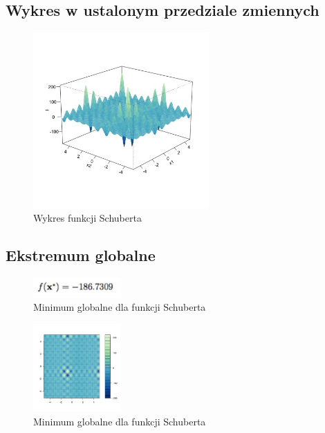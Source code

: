 \documentclass{article}
\begin{document}
    
    
    \subsection{Wykres w ustalonym przedziale zmiennych}
    
    \begin{figure}[!h]
    \centering
    \includegraphics[width=0.6\textwidth]{inc/wykresyfunkcji/schubert}
     \caption{Wykres  funkcji Schuberta}
    \end{figure}
    
    \subsection{Ekstremum globalne}
    
       \begin{figure}[!h]
    \centering
    \includegraphics[width=0.3\textwidth]{inc/wzory/schubert-global-minimum}
     \caption{Minimum globalne dla funkcji Schuberta}
    \end{figure}
    
       \begin{figure}[!h]
    \centering
    \includegraphics[width=0.3\textwidth]{inc/wykresyfunkcji/schubert-global-minimum}
     \caption{Minimum globalne dla funkcji Schuberta}
    \end{figure}
    
\end{document}
